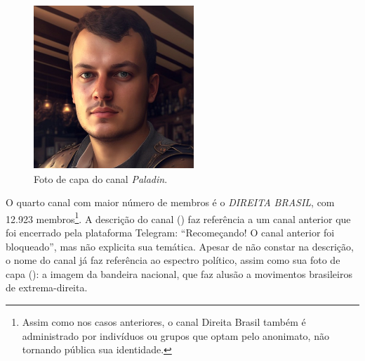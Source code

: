 \documentclass[portuguese]{textolivre}
\begin{document}
\begin{figure}[h!]
\begin{minipage}[t]{0.37\textwidth}
    \includegraphics[width=\linewidth]{Imagens/Fig6.png}
        \caption{Foto de capa do canal \emph{Paladin}.}
        \label{fig-6}
    \end{minipage}
\end{figure}

O quarto canal com maior número de membros é o \emph{DIREITA BRASIL}, com 12.923 membros\footnote{Assim como nos casos anteriores, o canal Direita Brasil também é administrado por indivíduos ou grupos que optam pelo anonimato, não tornando pública sua identidade.}. A descrição do canal () faz referência a um canal anterior que foi encerrado pela plataforma Telegram: ``Recomeçando! O canal anterior foi bloqueado'', mas não explicita sua temática. Apesar de não constar na descrição, o nome do canal já faz referência ao espectro político, assim como sua foto de capa (): a imagem da bandeira nacional, que faz alusão a movimentos brasileiros de extrema-direita. 
\end{document}

